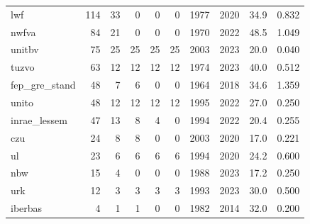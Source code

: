 \begin{longtable}[t]{@{}p{3.2cm}rrrrrrrrr@{}}
lwf & 114 & 33 & 0 & 0 & 0 & 1977 & 2020 & 34.9 & 0.832\\
nwfva & 84 & 21 & 0 & 0 & 0 & 1970 & 2022 & 48.5 & 1.049\\
unitbv & 75 & 25 & 25 & 25 & 25 & 2003 & 2023 & 20.0 & 0.040\\
tuzvo & 63 & 12 & 12 & 12 & 12 & 1974 & 2023 & 40.0 & 0.512\\
fep\_gre\_stand & 48 & 7 & 6 & 0 & 0 & 1964 & 2018 & 34.6 & 1.359\\
unito & 48 & 12 & 12 & 12 & 12 & 1995 & 2022 & 27.0 & 0.250\\
inrae\_lessem & 47 & 13 & 8 & 4 & 0 & 1994 & 2022 & 20.4 & 0.255\\
czu & 24 & 8 & 8 & 0 & 0 & 2003 & 2020 & 17.0 & 0.221\\
ul & 23 & 6 & 6 & 6 & 6 & 1994 & 2020 & 24.2 & 0.600\\
nbw & 15 & 4 & 0 & 0 & 0 & 1988 & 2023 & 17.2 & 0.250\\
urk & 12 & 3 & 3 & 3 & 3 & 1993 & 2023 & 30.0 & 0.500\\
iberbas & 4 & 1 & 1 & 0 & 0 & 1982 & 2014 & 32.0 & 0.200\\
\bottomrule
\end{longtable}
\endgroup
